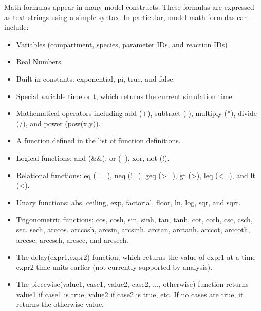 \documentclass[titlepage,11pt]{article}
\begin{document}
\noindent
Math formulas appear in many model constructs.  These formulas are expressed as text strings using a simple syntax.  In particular, model math formulas can include: 
\begin{itemize}
\item Variables (compartment, species, parameter IDs, and reaction IDs)
\item Real Numbers
\item Built-in constants: exponential, pi, true, and false.
\item Special variable time or t, which returns the current simulation time.
\item Mathematical operators including add (+), subtract (-), multiply (*), divide (/), and power (pow(x,y)).
\item A function defined in the list of function definitions.
\item Logical functions: and (\&\&), or ($||$), xor, not (!).
\item Relational functions: eq (==), neq (!=), geq (>=), gt (>), leq (<=), and lt (<).
\item Unary functions: abs, ceiling, exp, factorial, floor, ln, log, sqr, and sqrt.
\item Trigonometric functions: cos, cosh, sin, sinh, tan, tanh, cot, coth, csc, csch, sec, sech, arccos, arccosh, arcsin, arcsinh, arctan, arctanh, arccot, arccoth, arccsc, arccsch, arcsec, and arcsech.
\item The delay(expr1,expr2) function, which returns the value of expr1 at a time expr2 time units earlier (not currently supported by analysis).
\item The piecewise(value1, case1, value2, case2, ..., otherwise) function returns value1 if case1 is true, value2 if case2 is true, etc.  If no cases are true, it returns the otherwise value.
\end{itemize}
\end{document}

